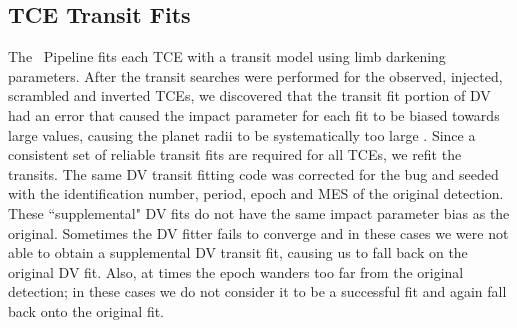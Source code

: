 \subsection{TCE Transit Fits}

The \Kepler\ Pipeline fits each TCE with a \citet{Mandel2002} transit model using \citet{Claret2000} limb darkening parameters. After the transit searches were performed for the observed, injected, scrambled and inverted TCEs, we discovered that the transit fit portion of DV had an error that caused the impact parameter for each fit to be biased towards large values, causing the planet radii to be systematically too large \citep[for further information see][]{Christiansen2017}. Since a consistent set of reliable transit fits are required for all TCEs, we refit the transits.  The same DV transit fitting code was corrected for the bug and seeded with the \Kepler{} identification number, period, epoch and MES of the original detection. These ``supplemental" DV fits do not have the same impact parameter bias as the original.  Sometimes the DV fitter fails to converge and in these cases we were not able to obtain a supplemental DV transit fit, causing us to fall back on the original DV fit. Also, at times the epoch wanders too far from the original detection; in these cases we do not consider it to be a successful fit and again fall back onto the original fit.

